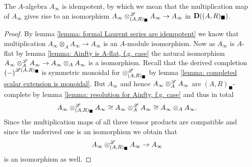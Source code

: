 \begin{lemma}
	\label{lemma: Ainfty is idempotent, f.g. case}
	
	The $A$-algebra $A_\infty$ is idempotent, by which we mean that the multiplication map of $A_\infty$ gives rise to an isomorphism $A_\infty\otimes^{\mathscr{L}}_{(A, R)_\blacksquare} A_\infty \to A_\infty$ in ${{\mathbf{D}}((A, R)_\blacksquare)}$.
\end{lemma}
\begin{proof}
	By lemma \ref{lemma: formal Laurent series are idempotent} we know that multiplication $A_\infty\otimes_A A_\infty\to A_\infty$ is an $A$-module isomorphism. Now as $A_\infty$ is $A$-flat by lemma \ref{lemma: Ainfty is A-flat, f.g. case} the natural isomorphism $A_\infty\otimes^{\mathscr{L}}_A A_\infty \to A_\infty\otimes_A A_\infty$ is a isomorphism. Recall that the derived completion $\derivedCompletion{-}{(A,R)_\blacksquare}$ is symmetric monoidal for $\otimes^{\mathscr{L}}_{(A,R)_\blacksquare}$ by lemma \ref{lemma: completed scalar extension is monoidal}. But $A_\infty$ and hence $A_\infty \otimes^{\mathscr{L}}_A A_\infty$ are $(A, R)_\blacksquare$-complete by lemma \ref{lemma: resolution for Ainfty, f.g. case} and thus in total
		$$A_\infty\otimes^{\mathscr{L}}_{(A, R)_\blacksquare} A_\infty\cong A_\infty \otimes^{\mathscr{L}}_A A_\infty \cong A_\infty\otimes_A A_\infty.$$
	Since the multiplication maps of all three tensor products are compatible and since the underived one is an isomorphism we obtain that
		$$A_\infty \otimes^{\mathscr{L}}_{(A, R)_\blacksquare} A_\infty \to A_\infty$$
	is an isomorphism as well.
\end{proof}

